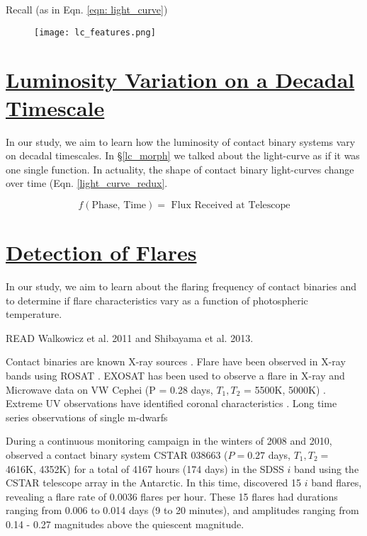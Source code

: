 \documentclass[12pt]{article} %
\numberwithin{equation}{section} %
\begin{document}
Recall (as in Eqn. \ref{eqn: light_curve}) 

\begin{figure}[H]
\centering
\texttt{[image: lc\_features.png]}
\caption{ }
\label{fig: lc_features}
\end{figure}

\cite{o1951so}

\section[Luminosity Variation on a Decadal Timescale]{\hyperlink{toc}{Luminosity Variation on a Decadal Timescale}} \label{sec: dec_var}

In our study, we aim to learn how the luminosity of contact binary systems vary on decadal timescales. In \S\ref{lc_morph} we talked about the light-curve as if it was one single function. In actuality, the shape of contact binary light-curves change over time (Eqn. \ref{light_curve_redux}.

\begin{equation} \label{eqn: light_curve_redux}
f(\text{Phase, Time}) = \text{ Flux Received at Telescope}
\end{equation}



\section[Detection of Flares]{\hyperlink{toc}{Detection of Flares}} \label{sec: flares}

In our study, we aim to learn about the flaring frequency of contact binaries and to determine if flare characteristics vary as a function of photospheric temperature.

READ Walkowicz et al. 2011 and Shibayama et al. 2013. 

Contact binaries are known X-ray sources \citep{chen2006w}. Flare have been observed in X-ray bands using ROSAT \citep{mcgale1996rosat}.
EXOSAT has been used to observe a flare in X-ray and Microwave data on VW Cephei (P =  0.28 days, $T_{1}, T_{2}$ = 5500K, 5000K) \citep{vilhu1988simultaneous}. Extreme UV observations have identified coronal characteristics \citep{brickhouse1998extreme}. Long time series observations of single m-dwarfs  \citep{lacy1976uv}

During a continuous monitoring campaign in the winters of 2008 and 2010, \citet{qian2014optical} observed a contact binary system CSTAR 038663 ($P = 0.27$ days, $T_{1}, T_{2} =$ 4616K, 4352K) for a total of 4167 hours (174 days) in the SDSS $i$ band using the CSTAR telescope array in the Antarctic. In this time, \citet{qian2014optical} discovered 15 $i$ band flares, revealing a flare rate of $0.0036$ flares per hour. These 15 flares had durations ranging from 0.006 to 0.014 days (9 to 20 minutes), and amplitudes ranging from 0.14 - 0.27 magnitudes above the quiescent magnitude.
\end{document}
